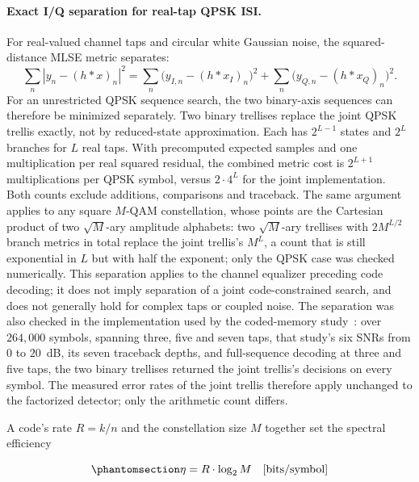 \paragraph{Exact I/Q separation for real-tap QPSK ISI.}\label{sec:iq-mlse-factorization}
For real-valued channel taps and circular white Gaussian noise, the squared-distance MLSE metric \cite{Forney1972MLSE,ProakisSalehi2008DigitalComm} separates:
\begin{equation}\label{eq:iq-mlse-factorization}
\sum_n |y_n-(h*x)_n|^2
=\sum_n \bigl(y_{I,n}-(h*x_I)_n\bigr)^2
+\sum_n \bigl(y_{Q,n}-(h*x_Q)_n\bigr)^2.
\end{equation}
For an unrestricted QPSK sequence search, the two binary-axis sequences can therefore be minimized separately. Two binary trellises replace the joint QPSK trellis exactly, not by reduced-state approximation. Each has $2^{L-1}$ states and $2^L$ branches for $L$ real taps. With precomputed expected samples and one multiplication per real squared residual, the combined metric cost is $2^{L+1}$ multiplications per QPSK symbol, versus $2\cdot 4^{L}$ for the joint implementation. Both counts exclude additions, comparisons and traceback. The same argument applies to any square $M$-QAM constellation, whose points are the Cartesian product of two $\sqrt{M}$-ary amplitude alphabets: two $\sqrt{M}$-ary trellises with $2M^{L/2}$ branch metrics in total replace the joint trellis's $M^{L}$, a count that is still exponential in $L$ but with half the exponent; only the QPSK case was checked numerically. This separation applies to the channel equalizer preceding code decoding; it does not imply separation of a joint code-constrained search, and does not generally hold for complex taps or coupled noise. The separation was also checked in the implementation used by the coded-memory study~: over $264{,}000$ symbols, spanning three, five and seven taps, that study's six SNRs from $0$ to $20$~dB, its seven traceback depths, and full-sequence decoding at three and five taps, the two binary trellises returned the joint trellis's decisions on every symbol. The measured error rates of the joint trellis therefore apply unchanged to the factorized detector; only the arithmetic count differs.

A code's rate $R = k/n$ and the constellation size $M$ together set the spectral efficiency

\begin{equation}\protect\phantomsection\label{eq:spectral-efficiency}{\eta = R \cdot \log_2 M \quad \text{[bits/symbol]}}\end{equation}

